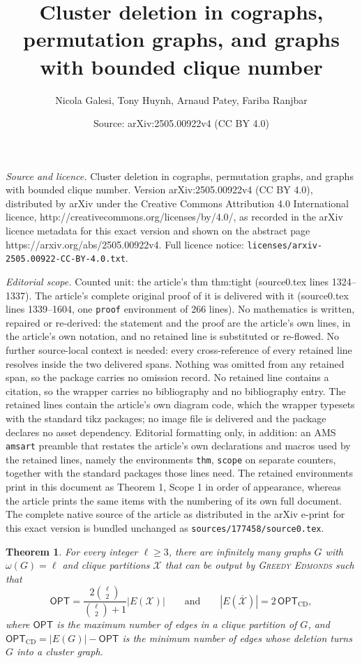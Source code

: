 \documentclass[10pt,a4paper]{amsart}
\title{Cluster deletion in cographs, permutation graphs, and graphs with bounded clique number}
\author{Nicola Galesi, Tony Huynh, Arnaud Patey, Fariba Ranjbar}
\date{Source: arXiv:2505.00922v4 (CC BY 4.0)}
\newtheorem{thm}{Theorem}
\newcommand{\edmonds}{{\textsc{Greedy Edmonds}}}
\newcommand{\opt}{{\mathsf{OPT}}}
\begin{document}
\maketitle

\noindent\emph{Source and licence.} Cluster deletion in cographs, permutation graphs, and graphs with bounded clique number. Version arXiv:2505.00922v4 (CC BY 4.0), distributed by arXiv under the Creative Commons Attribution 4.0 International licence, http://creativecommons.org/licenses/by/4.0/, as recorded in the arXiv licence metadata for this exact version and shown on the abstract page https://arxiv.org/abs/2505.00922v4. Full licence notice: \texttt{licenses/arxiv-2505.00922-CC-BY-4.0.txt}.\par\smallskip

\noindent\textit{Editorial scope.} Counted unit: the article's thm thm:tight (source0.tex lines 1324--1337). The article's complete original proof of it is delivered with it (source0.tex lines 1339--1604, one \texttt{proof} environment of 266 lines). No mathematics is written, repaired or re-derived: the statement and the proof are the article's own lines, in the article's own notation, and no retained line is substituted or re-flowed.  No further source-local context is needed: every cross-reference of every retained line resolves inside the two delivered spans.  Nothing was omitted from any retained span, so the package carries no omission record.  No retained line contains a citation, so the wrapper carries no bibliography and no bibliography entry.  The retained lines contain the article's own diagram code, which the wrapper typesets with the standard tikz packages; no image file is delivered and the package declares no asset dependency.  Editorial formatting only, in addition: an AMS \texttt{amsart} preamble that restates the article's own declarations and macros used by the retained lines, namely the environments \texttt{thm}, \texttt{scope} on separate counters, together with the standard packages those lines need.  The retained environments print in this document as Theorem 1, Scope 1 in order of appearance, whereas the article prints the same items with the numbering of its own full document.  The complete native source of the article as distributed in the arXiv e-print for this exact version is bundled unchanged as \texttt{sources/177458/source0.tex}.
\begin{thm} \label{thm:tight}
For every integer $\ell\geq 3$, there are infinitely many graphs $G$
with $\omega(G)=\ell$ and clique partitions $\mathcal{X}$ that can
be output by \edmonds{} such that
\[
   \opt=
   \frac{2\binom{\ell}{2}}{\binom{\ell}{2}+1}
   |E(\mathcal{X})|
   \qquad\text{and}\qquad
   |E(\overline{\mathcal{X}})| = 2\,\opt_{\mathrm{CD}},
\]
where $\opt$ is the maximum number of edges in a clique partition of
$G$, and $\opt_{\mathrm{CD}}=|E(G)|-\opt$ is the minimum number of edges whose deletion turns $G$ into a cluster graph.
\end{thm}
\end{document}
